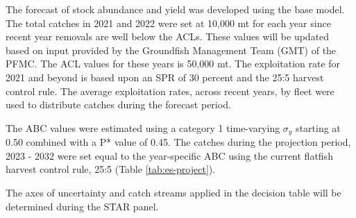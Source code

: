 \documentclass[11pt,
  english,
  a4paper,
]{article}
\begin{document}
\leavevmode\tagmcend\tagstructend


The forecast of stock abundance and yield was developed using the base model. The total catches in 2021 and 2022 were set at 10,000 mt for each year since recent year removals are well below the ACLs. These values will be updated based on input provided by the Groundfish Management Team (GMT) of the PFMC. The ACL values for these years is 50,000 mt. The exploitation rate for 2021 and beyond is based upon an SPR of 30 percent and the 25:5 harvest control rule. The average exploitation rates, across recent years, by fleet were used to distribute catches during the forecast period.

\leavevmode\tagmcend\tagstructend\par


The ABC values were estimated using a category 1 time-varying {\(\sigma_y\)\leavevmode\tagmcend\tagstructend} starting at 0.50 combined with a P* value of 0.45. The catches during the projection period, 2023 - 2032 were set equal to the year-specific ABC using the current flatfish harvest control rule, 25:5 (Table \ref{tab:es-project}).

\leavevmode\tagmcend\tagstructend\par


The axes of uncertainty and catch streams applied in the decision table will be determined during the STAR panel.

\leavevmode\tagmcend\tagstructend\par

\begingroup\fontsize{10}{12}\selectfont
\end{document}
